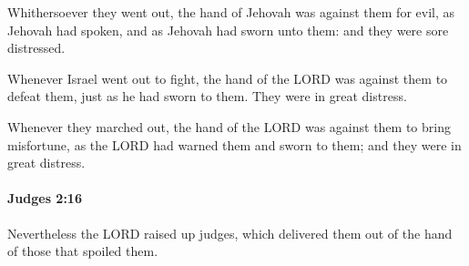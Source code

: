 			\begin{versebox}
					\item[BHS] 
					\item[ASV] Whithersoever they went out, the hand of Jehovah was against them for evil, as Jehovah had spoken, and as Jehovah had sworn unto them: and they were sore distressed.
					\item[NIV] Whenever Israel went out to fight, the hand of the LORD was against them to defeat them, just as he had sworn to them. They were in great distress.
					\item[NRSV] Whenever they marched out, the hand of the LORD was against them to bring misfortune, as the LORD had warned them and sworn to them; and they were in great distress.
			\end{versebox}

		\paragraph{Judges 2:16} %
			\label{JUDGES-2-16}

			Nevertheless the LORD raised up judges, which delivered them out of the hand of those that spoiled them.

